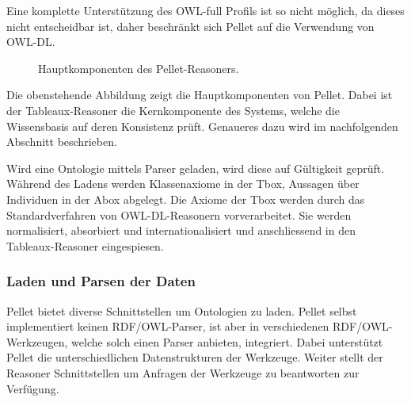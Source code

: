 Eine komplette Unterstützung des OWL-full Profils ist so nicht möglich, da dieses nicht entscheidbar ist, daher beschränkt sich Pellet auf die Verwendung von OWL-DL\@.~\cite[Seite 13]{sirin:pellet05}






\begin{figure}[htbp]
\centering {}
\caption{Hauptkomponenten des Pellet-Reasoners.\label{fig:pellet_komponenten}\protect\footnotemark}
\end{figure}

Die obenstehende Abbildung zeigt die Hauptkomponenten von Pellet. Dabei ist der Tableaux-Reasoner die Kernkomponente des Systems, welche die Wissensbasis auf deren Konsistenz prüft. Genaueres dazu wird im nachfolgenden Abschnitt beschrieben.

Wird eine Ontologie mittels Parser geladen, wird diese auf Gültigkeit geprüft. Während des Ladens werden Klassenaxiome in der Tbox, Aussagen über Individuen in der Abox abgelegt. Die Axiome der Tbox werden durch das Standardverfahren von OWL-DL-Reasonern vorverarbeitet. Sie werden normalisiert, absorbiert und internationalisiert und anschliessend in den Tableaux-Reasoner eingespiesen.


\subsubsection{Laden und Parsen der Daten}
\label{ssubsection:inferenz_pellet_parsing}
Pellet bietet diverse Schnittstellen um Ontologien zu laden. Pellet selbst implementiert keinen RDF/OWL-Parser, ist aber in verschiedenen RDF/OWL-Werkzeugen, welche solch einen Parser anbieten, integriert. Dabei unterstützt Pellet die unterschiedlichen Datenstrukturen der Werkzeuge. Weiter stellt der Reasoner Schnittstellen um Anfragen der Werkzeuge zu beantworten zur Verfügung.

